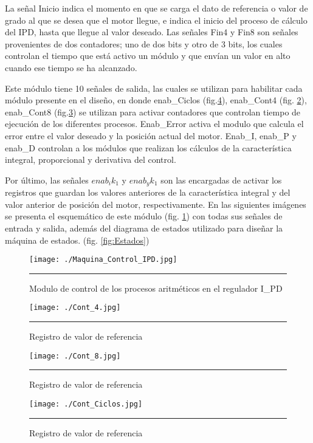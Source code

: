 \documentclass[12pt,a4paper]{article} %
\begin{document}
La señal Inicio indica el momento en que se carga el dato de referencia o valor de grado al que se desea que el motor llegue, e indica el inicio del proceso de cálculo del IPD, hasta que llegue  al valor deseado. Las señales Fin4 y Fin8 son señales provenientes de dos contadores; uno de dos bits y otro de 3 bits, los cuales controlan el tiempo que  está activo un módulo y que envían un valor en alto cuando ese tiempo se ha alcanzado. 

Este  módulo tiene 10 señales de salida, las cuales se utilizan para habilitar cada módulo presente en el diseño, en donde enab\_Ciclos (fig.\ref{fig:contn}), enab\_Cont4 (fig. \ref{fig:cont4}), enab\_Cont8 (fig.\ref{fig:cont8}) se utilizan para activar contadores que controlan tiempo de ejecución de los diferentes procesos. Enab\_Error activa el modulo que calcula el error entre el valor deseado y la posición actual del motor. Enab\_I, enab\_P y enab\_D controlan a los módulos que realizan los cálculos de la característica integral, proporcional y derivativa del control. 

Por último, las señales $enab_ik_1$ y $enab_yk_1$ son las encargadas de activar los registros que guardan los valores anteriores de la característica integral y del valor anterior de posición del motor, respectivamente. En las siguientes imágenes se presenta el esquemático de este módulo (fig. \ref{fig:MaqIPD}) con todas sus señales de entrada y salida, además del diagrama de estados utilizado para diseñar la máquina de estados. (fig. \ref{fig:Estados})

\begin{figure}[htbp]
  \centering
    \texttt{[image: ./Maquina\_Control\_IPD.jpg]}
    \rule{35em}{0.3pt}
  \caption[REF]{Modulo de control de los procesos aritméticos en el regulador I\_PD}
  \label{fig:MaqIPD}
\end{figure}

\begin{figure}[htbp]
  \centering
    \texttt{[image: ./Cont\_4.jpg]}
    \rule{35em}{0.3pt}
  \caption[cont4]{Registro de valor de referencia}
  \label{fig:cont4}
\end{figure}

\begin{figure}[htbp]
  \centering
    \texttt{[image: ./Cont\_8.jpg]}
    \rule{35em}{0.3pt}
  \caption[cont8]{Registro de valor de referencia}
  \label{fig:cont8}
\end{figure}

\begin{figure}[htbp]
  \centering
    \texttt{[image: ./Cont\_Ciclos.jpg]}
    \rule{35em}{0.3pt}
  \caption[contn]{Registro de valor de referencia}
  \label{fig:contn}
\end{figure}
\end{document}
